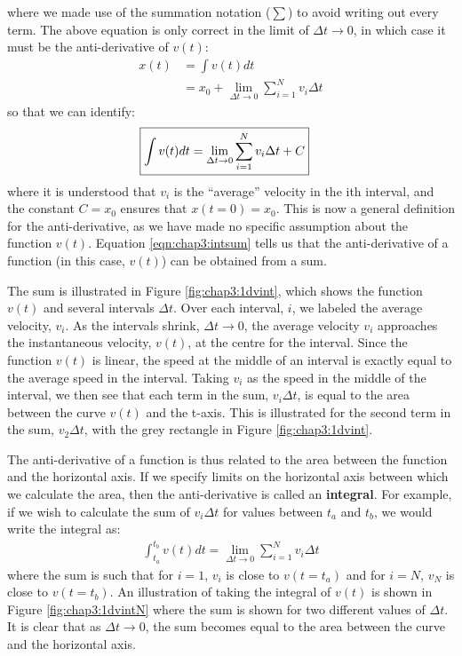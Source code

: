 
where we made use of the summation notation ($\sum$) to avoid writing out every term. The above equation is only correct in the limit of $\Delta t\to 0$, in which case it must be the anti-derivative of $v(t)$:
\begin{align*}
x(t) &= \int v(t) dt\\
     &= x_0+\lim_{\Delta t\to 0}\sum_{i=1}^Nv_i\Delta t 
\end{align*}
so that we can identify:
\begin{align}
\label{eqn:chap3:intsum}
\Aboxed{\int v(t) dt&=\lim_{\Delta t\to 0}\sum_{i=1}^Nv_i\Delta t + C}
\end{align}
where it is understood that $v_i$ is the ``average'' velocity in the ith interval, and the constant $C=x_0$ ensures that $x(t=0)=x_0$. This is now a general definition for the anti-derivative, as we have made no specific assumption about the function $v(t)$. Equation \ref{eqn:chap3:intsum} tells us that the anti-derivative of a function (in this case, $v(t)$) can be obtained from a sum.

The sum is illustrated in Figure \ref{fig:chap3:1dvint}, which shows the function $v(t)$ and several intervals $\Delta t$. Over each interval, $i$, we labeled the average velocity, $v_i$. As the intervals shrink, $\Delta t\to 0$, the average velocity $v_i$ approaches the instantaneous velocity, $v(t)$, at the centre for the interval. Since the function $v(t)$ is linear, the speed at the middle of an interval is exactly equal to the average speed in the interval. Taking $v_i$ as the speed in the middle of the interval, we then see that each term in the sum, $v_i\Delta t$, is equal to the area between the curve $v(t)$ and the t-axis. This is illustrated for the second term in the sum, $v_2\Delta t$, with the grey rectangle in Figure \ref{fig:chap3:1dvint}.

The anti-derivative of a function is thus related to the area between the function and the horizontal axis. If we specify limits on the horizontal axis between which we calculate the area, then the anti-derivative is called an \textbf{integral}. For example, if we wish to calculate the sum of $v_i \Delta t$ for values between $t_a$ and $t_b$, we would write the integral as:
\begin{align*}
\int_{t_a}^{t_b}v(t) dt = \lim_{\Delta t\to 0}\sum_{i=1}^Nv_i\Delta t 
\end{align*}
where the sum is such that for $i=1$, $v_i$ is close to $v(t=t_a)$ and for $i=N$, $v_N$ is close to $v(t=t_b)$. An illustration of taking the integral of $v(t)$ is shown in Figure \ref{fig:chap3:1dvintN} where the sum is shown for two different values of $\Delta t$. It is clear that as $\Delta t \to 0$, the sum becomes equal to the area between the curve and the horizontal axis.

